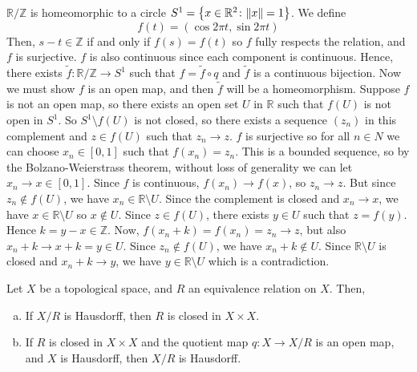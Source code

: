 \begin{example}
	\( \mathbb R / \mathbb Z \) is homeomorphic to a circle \( S^1 = \qty{x \in \mathbb R^2 \colon \norm{x} = 1} \).
	We define
	\[
		f(t) = (\cos 2 \pi t, \sin 2 \pi t)
	\]
	Then, \( s - t \in \mathbb Z \) if and only if \( f(s) = f(t) \) so \( f \) fully respects the relation, and \( f \) is surjective.
	\( f \) is also continuous since each component is continuous.
	Hence, there exists \( \widetilde f \colon \mathbb R / \mathbb Z \to S^1 \) such that \( f = \widetilde f \circ q \) and \( \widetilde f \) is a continuous bijection.
	Now we must show \( f \) is an open map, and then \( \widetilde f \) will be a homeomorphism.
	Suppose \( f \) is not an open map, so there exists an open set \( U \) in \( \mathbb R \) such that \( f(U) \) is not open in \( S^1 \).
	So \( S^1 \setminus f(U) \) is not closed, so there exists a sequence \( (z_n) \) in this complement and \( z \in f(U) \) such that \( z_n \to z \).
	\( f \) is surjective so for all \( n \in N \) we can choose \( x_n \in [0,1] \) such that \( f(x_n) = z_n \).
	This is a bounded sequence, so by the Bolzano-Weierstrass theorem, without loss of generality we can let \( x_n \to x \in [0,1] \).
	Since \( f \) is continuous, \( f(x_n) \to f(x) \), so \( z_n \to z \).
	But since \( z_n \not\in f(U) \), we have \( x_n \in \mathbb R \setminus U \).
	Since the complement is closed and \( x_n \to x \), we have \( x \in \mathbb R \setminus U \) so \( x \not\in U \).
	Since \( z \in f(U) \), there exists \( y \in U \) such that \( z = f(y) \).
	Hence \( k = y - x \in \mathbb Z \).
	Now, \( f(x_n + k) = f(x_n) = z_n \to z \), but also \( x_n + k \to x + k = y \in U \).
	Since \( z_n \not\in f(U) \), we have \( x_n + k \not\in U \).
	Since \( \mathbb R \setminus U \) is closed and \( x_n + k \to y \), we have \( y \in \mathbb R \setminus U \) which is a contradiction.
\end{example}
\begin{proposition}
	Let \( X \) be a topological space, and \( R \) an equivalence relation on \( X \).
	Then,
	\begin{enumerate}[(a)]
		\item If \( X / R \) is Hausdorff, then \( R \) is closed in \( X \times X \).
		\item If \( R \) is closed in \( X \times X \) and the quotient map \( q \colon X \to X/R \) is an open map, and \( X \) is Hausdorff, then \( X / R \) is Hausdorff.
	\end{enumerate}
\end{proposition}
